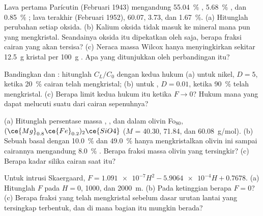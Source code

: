 \begin{exercise}[$\star$]\label{exo:b2:magmatic-differentiation:4}
Lava pertama Parícutin (Februari 1943) mengandung \qty{55.04}{\percent} ,
\qty{5.68}{\percent} , dan \qty{0.85}{\percent} ; lava terakhir (Februari
1952), 60.07, 3.73, dan \qty{1.67}{\percent}. (a) Hitunglah perubahan setiap oksida.
(b) Kalium oksida tidak masuk ke mineral mana pun yang mengkristal. Seandainya oksida itu dipekatkan oleh
 saja, berapa fraksi cairan yang akan tersisa?
(c) Neraca massa Wilcox hanya menyingkirkan sekitar \qty{12.5}{g} kristal per
\qty{100}{g} . Apa yang ditunjukkan oleh perbandingan itu?
\end{exercise}

\begin{exercise}[$\star\star$]\label{exo:b2:magmatic-differentiation:5}
Bandingkan  dan : hitunglah $C_L/C_0$ dengan kedua hukum
(a) untuk nikel, $D = 5$, ketika \qty{20}{\percent} cairan telah mengkristal; (b)
untuk , $D = 0.01$, ketika \qty{90}{\percent} telah mengkristal.
(c) Berapa limit kedua hukum itu ketika $F \to 0$? Hukum mana yang dapat melucuti suatu
 dari cairan sepenuhnya?
\end{exercise}

\begin{exercise}[$\star\star$]\label{exo:b2:magmatic-differentiation:6}
(a) Hitunglah persentase massa , , dan  dalam olivin
Fo$_{80}$, $(\ce{Mg}_{0.8}\ce{Fe}_{0.2})_2\ce{SiO4}$ ($M$ = 40.30, 71.84, dan
\qty{60.08}{g/mol}). (b) Sebuah basal dengan \qty{10.0}{\percent}  dan
\qty{49.0}{\percent}  hanya mengkristalkan olivin ini sampai cairannya mengandung
\qty{8.0}{\percent} . Berapa fraksi massa olivin yang tersingkir? (c) Berapa
kadar silika cairan saat itu?
\end{exercise}

\begin{exercise}[$\star\star$]\label{exo:b2:magmatic-differentiation:7}
Untuk intrusi Skaergaard, $F = \num{1.091e-7}H^2 - \num{5.9064e-4}H + 0.7678$.
(a) Hitunglah $F$ pada $H = 0$, 1000, dan \qty{2000}{m}. (b) Pada ketinggian berapa $F = 0$?
(c) Berapa fraksi  yang telah mengkristal sebelum dasar urutan lantai yang tersingkap
terbentuk, dan di mana bagian itu mungkin berada?
\end{exercise}

